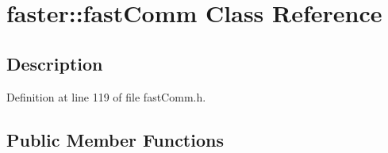 \hypertarget{classfaster_1_1fastComm}{}\section{faster\+:\+:fast\+Comm Class Reference}
\label{classfaster_1_1fastComm}


\subsection{Description}


Definition at line 119 of file fast\+Comm.\+h.

\subsection*{Public Member Functions}
